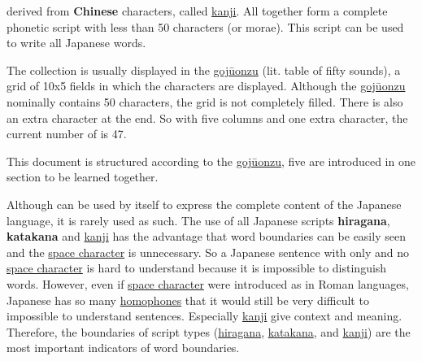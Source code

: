 \jscript{} derived from \textbf{Chinese} characters, called
\hyperref[sec:Kanji]{kanji}. All \jtopic{} together form a complete phonetic
script with less than 50 characters (or morae). This script can be used to
write all Japanese words.


The \textbf{\jtopic} collection is usually displayed in the
\hyperref[sec:Gojuonzu]{gojūonzu} (lit. table of fifty sounds), a grid of 10x5
fields in which the characters are displayed. Although the
\hyperref[sec:Gojuonzu]{gojūonzu} nominally contains 50 characters, the grid is
not completely filled. There is also an extra character at the end. So with
five columns and one extra character, the current number of \textbf{\jtopic} is
47. %
%
%



This document is structured according to the \hyperref[sec:Gojuonzu]{gojūonzu},
five \textbf{\jtopic} are introduced in one section to be learned together.


Although \textbf{\jtopic} can be used by itself to express the complete content
of the Japanese language, it is rarely used as such. The use of all Japanese
scripts \textbf{hiragana}, \textbf{katakana} and \hyperref[sec:Kanji]{kanji}
has the advantage that word boundaries can be easily seen and the
\hyperref[sec:SpaceCharacter]{space character} is unnecessary. So a Japanese
\textbf{\jtopic} sentence with only \textbf{\jtopic} and no
\hyperref[sec:SpaceCharacter]{space character} is hard to understand because it
is impossible to distinguish words. However, even if
\hyperref[sec:SpaceCharacter]{space character} were introduced as in Roman
languages, Japanese has so many \hyperref[sec:Homophone]{homophones} that it
would still be very difficult to impossible to understand sentences.
Especially \hyperref[sec:Kanji]{kanji} give context and meaning. Therefore, the
boundaries of script types (\hyperref[sec:Hiragana]{hiragana},
\hyperref[sec:Katakana]{katakana}, and \hyperref[sec:Kanji]{kanji}) are the
most important indicators of word boundaries.

